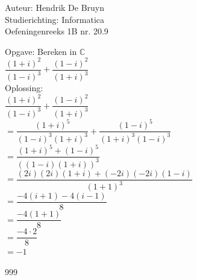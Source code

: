 \documentclass[a4paper]{article}
\begin{document}
  
\noindent \large Auteur: Hendrik De Bruyn \\
\noindent \large Studierichting: Informatica\\
\noindent \large Oefeningenreeks 1B nr. 20.9\\

\medskip

\normalsize

Opgave: Bereken in $\mathbb{C}$\\

$\dfrac{(1+i)^2}{(1-i)^3} + \dfrac{(1-i)^2}{(1+i)^3}$ \\

Oplossing: \\

$\dfrac{(1+i)^2}{(1-i)^3} + \dfrac{(1-i)^2}{(1+i)^3}$\\

$= \dfrac{(1+i)^5}{(1-i)^3(1+i)^3} + \dfrac{(1-i)^5}{(1+i)^3(1-i)^3}$\\

$= \dfrac{(1+i)^5 + (1-i)^5}{((1-i)(1+i))^3}$\\

$= \dfrac{(2i)(2i)(1+i) + (-2i)(-2i)(1-i)}{(1+1)^3}$\\

$= \dfrac{-4(i+1) -4(i-1)}{8}$\\

$= \dfrac{-4(1+1)}{8}$\\

$= \dfrac{-4\cdot2}{8}$\\

$= -1$

\begin{thebibliography}{999}
\end{thebibliography}
\end{document}
